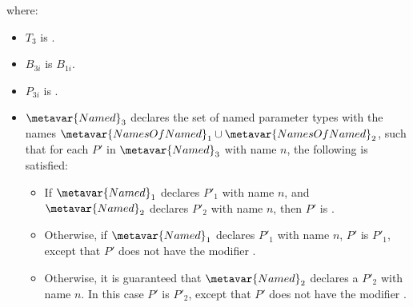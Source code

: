 \documentclass[makeidx]{article}
\begin{document}
{\begin{itemize}
  \noindent
  where:

  \begin{itemize}
  \item $T_3$ is .
  \item $B_{3i}$ is $B_{1i}$.
  \item $P_{3i}$ is .
  \item $\metavar{Named}_3$ declares the set
    of named parameter types with the names
    $\metavar{NamesOfNamed}_1\cup\metavar{NamesOfNamed}_2$,
    such that for each $P'$ in $\metavar{Named}_3$ with name $n$,
    the following is satisfied:
    \begin{itemize}
    \item If $\metavar{Named}_1$ declares $P'_1$ with name $n$,
      and $\metavar{Named}_2$ declares $P'_2$ with name $n$,
      then $P'$ is .
    \item Otherwise, if $\metavar{Named}_1$ declares $P'_1$ with name $n$,
      $P'$ is $P'_1$,
      except that $P'$ does not have the modifier \REQUIRED.
    \item Otherwise, it is guaranteed that
      $\metavar{Named}_2$ declares a $P'_2$ with name $n$.
      In this case $P'$ is $P'_2$,
      except that $P'$ does not have the modifier \REQUIRED.
    \end{itemize}
  \end{itemize}


\end{itemize}}
\end{document}
